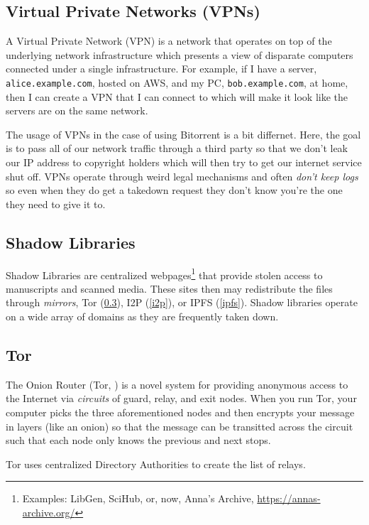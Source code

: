 \subsection{Virtual Private Networks (VPNs)}\label{vpn}

A Virtual Private Network (VPN) is a network that operates on top of the
underlying network infrastructure which presents a view of disparate computers
connected under a single infrastructure. For example, if I have a server,
\texttt{alice.example.com}, hosted on AWS, and my PC, \texttt{bob.example.com},
at home, then I can create a VPN that I can connect to which will make it look
like the servers are on the same network.

The usage of VPNs in the case of using Bitorrent is a bit differnet. Here, the
goal is to pass all of our network traffic through a third party so that we
don't leak our IP address to copyright holders which will then try to get our
internet service shut off. VPNs operate through weird legal mechanisms and often
\emph{don't keep logs} so even when they do get a takedown request they don't
know you're the one they need to give it to.

\subsection{Shadow Libraries}

Shadow Libraries are centralized webpages\footnote{Examples: LibGen, SciHub, or,
      now, Anna's Archive, \url{https://annas-archive.org/}} that provide stolen
access to manuscripts and scanned media. These sites then may redistribute
the files through \emph{mirrors}, Tor (\ref{tor}), I2P (\ref{i2p}), or
IPFS (\ref{ipfs}). Shadow libraries operate on a wide array of domains as
they are frequently taken down.

\subsection{Tor}\label{tor}

The Onion Router (Tor, \cite{TorProjectPrivacy}) is a novel system for providing
anonymous access to the Internet via \emph{circuits} of guard, relay, and exit
nodes. When you run Tor, your computer picks the three aforementioned nodes and
then encrypts your message in layers (like an onion) so that the message can be
transitted across the circuit such that each node only knows the previous and
next stops.

Tor uses centralized Directory Authorities \cite{TorProjectDirectory} to create
the list of relays.

